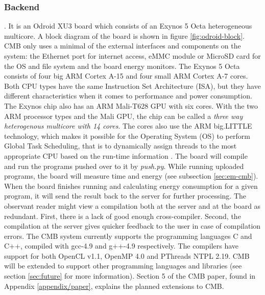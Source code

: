 \subsubsection{Backend} . It is an Odroid XU3 board \cite{m:odroid} which consists of an Exynos 5 Octa heterogeneous multicore. A block diagram of the board is shown in figure \ref{fig:odroid-block}. CMB only uses a minimal of the external interfaces and components on the system: the Ethernet port for internet access, eMMC module or MicroSD card for the OS and file system and the board energy monitors. The Exynos 5 Octa consists of four big ARM Cortex A-15 and four small ARM Cortex A-7 cores. Both CPU types have the same Instruction Set Architecture (ISA), but they have different characteristics when it comes to performance and power consumption. The Exynos chip also has an ARM Mali-T628 GPU with six cores. With the two ARM processor types and the Mali GPU, the chip can be called a \textit{three way heterogenous multicore with 14 cores}. The cores also use the ARM big.LITTLE technology, which makes it possible for the Operating System (OS) to perform Global Task Scheduling, that is to dynamically assign threads to the most appropriate CPU based on the run-time information \cite{m:big-little}. The board will compile and run the programs pushed over to it by \textit{push.py}. While running uploaded programs, the board will measure time and energy (see subsection \ref{sec:em-cmb}). When the board finishes running and calculating energy consumption for a given program, it will send the result back to the server for further processing. The observant reader might view a compilation both at the server and at the board as redundant. First, there is a lack of good enough cross-compiler. Second, the compilation at the server gives quicker feedback to the user in case of compilation errors. The CMB system currently supports the programming languages C and C++, compiled with gcc-4.9 and g++-4.9 respectively. The compilers have support for both OpenCL v1.1, OpenMP 4.0 and PThreads NTPL 2.19. CMB will be extended to support other programming languages and libraries (see section \ref{sec:future} for more information). Section 5 of the CMB paper, found in Appendix \ref{appendix/paper}, explains the planned extensions to CMB.

